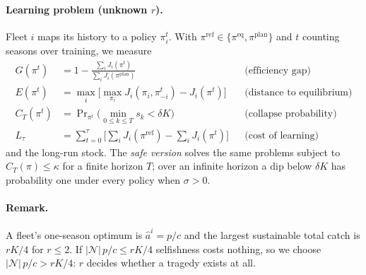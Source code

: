 \documentclass{article}
\begin{document}
\paragraph{Learning problem (unknown $r$).} Fleet $i$ maps its history to a policy $\pi^t_i$. With $\pi^{\mathrm{ref}}\in\{\pi^{\mathrm{eq}},\pi^{\mathrm{plan}}\}$ and $t$ counting seasons over training, we measure
\begin{align}
G(\pi^t)&=1-\frac{\sum_i J_i(\pi^t)}{\sum_i J_i(\pi^{\mathrm{plan}})} &&\text{(efficiency gap)}\\
E(\pi^t)&=\max_{i}\Big[\max_{\pi_i}J_i(\pi_i,\pi^t_{-i})-J_i(\pi^t)\Big] &&\text{(distance to equilibrium)}\\
C_T(\pi^t)&=\Pr\nolimits_{\pi^t}\Big(\min_{0\le k\le T}s_k<\delta K\Big) &&\text{(collapse probability)}\\
L_\tau&=\sum_{t=0}^{\tau}\Big[\sum_i J_i(\pi^{\mathrm{ref}})-\sum_i J_i(\pi^t)\Big] &&\text{(cost of learning)}
\end{align}
and the long-run stock. The \emph{safe version} solves the same problems subject to $C_T(\pi)\le\kappa$ for a finite horizon $T$; over an infinite horizon a dip below $\delta K$ has probability one under every policy when $\sigma>0$.

\paragraph{Remark.} A fleet's one-season optimum is $\hat a^i=p/c$ and the largest sustainable total catch is $rK/4$ for $r\le2$. If $|\mathcal N|\,p/c\le rK/4$ selfishness costs nothing, so we choose $|\mathcal N|\,p/c>rK/4$: $r$ decides whether a tragedy exists at all.

\end{document}
